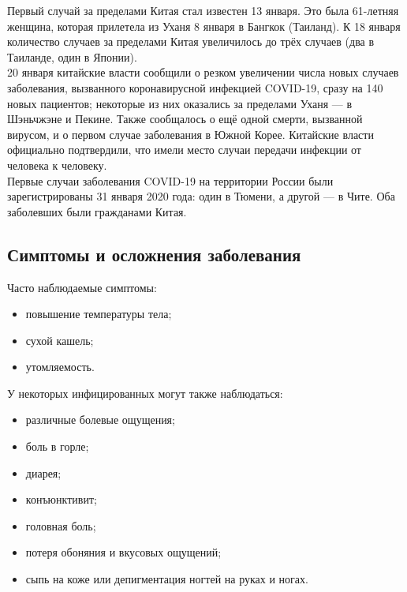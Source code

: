 \documentclass[a4paper, 12pt]{extarticle}
\begin{document}
Первый случай за пределами Китая стал известен 13 января. Это была 61-летняя
женщина, которая прилетела из Уханя 8 января в Бангкок (Таиланд). К 18 января
количество случаев за пределами Китая увеличилось до трёх случаев (два в
Таиланде, один в Японии).
\\

20 января китайские власти сообщили о резком увеличении числа новых случаев
заболевания, вызванного коронавирусной инфекцией COVID-19, сразу на 140 новых
пациентов; некоторые из них оказались за пределами Уханя — в Шэньчжэне и
Пекине. Также сообщалось о ещё одной смерти, вызванной вирусом, и о первом
случае заболевания в Южной Корее. Китайские власти официально подтвердили, что
имели место случаи передачи инфекции от человека к человеку.
\\

Первые случаи заболевания COVID-19 на территории России были зарегистрированы
31 января 2020 года: один в Тюмени, а другой — в Чите. Оба заболевших были
гражданами Китая.
\newpage

\subsection{Симптомы и осложнения заболевания}

\vspace{5mm}

Часто наблюдаемые симптомы:
\begin{itemize}
    \item повышение температуры тела;
    \item сухой кашель;
    \item утомляемость.
\end{itemize}

\vspace{5mm}

У некоторых инфицированных могут также наблюдаться:
\begin{itemize}
    \item различные болевые ощущения;
    \item боль в горле;
    \item диарея;
    \item конъюнктивит;
    \item головная боль;
    \item потеря обоняния и вкусовых ощущений;
    \item сыпь на коже или депигментация ногтей на руках и ногах.
\end{itemize}
\end{document}
